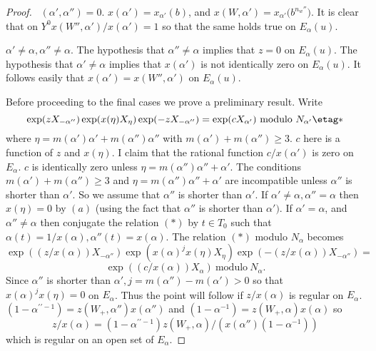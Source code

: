 \documentclass{memo-l}
\theoremstyle{definition}
\theoremstyle{remark}
\numberwithin{section}{chapter}
\numberwithin{equation}{chapter}
\begin{document}
\begin{proof}
\  $({\alpha}',{\alpha}'') = 0$.  $x({\alpha}')  = 
x_{{\alpha}'}(b)$, and $x(W,{\alpha}')  =  x_{{\alpha}'}{(b^{n_w''}})$.
It is clear that on $Y^{0}$\quad $x(W'',{\alpha}')/x({\alpha}')  =  1$ so that the
same holds true on $E_{{\alpha}}(u)$.
\enddefinition

 ${\alpha}' \ne {\alpha}, {\alpha}'' \ne {\alpha}$.  The
hypothesis that ${\alpha}'' \ne {\alpha}$ implies that $z = 0$ on
$E_{{\alpha}}(u)$.  The hypothesis that ${\alpha}' \ne {\alpha}$ implies
that $x({\alpha}')$ is not identically zero on $E_{{\alpha}}(u)$.  It
follows easily that $x({\alpha}')  =  x(W'',{\alpha}')$ on $E_{{\alpha}}(u)$.
\enddefinition


   Before proceeding to the final cases we prove a preliminary result.
Write
$$
\exp(zX_{-{\alpha}''})\exp(x({\eta})X_{{\eta}})\exp(-zX_{-{\alpha}''})  = 
\exp(cX_{{\alpha}'})\ {\text{modulo}}\ N_{{\alpha'}}  \etag *
$$
where ${\eta} = m({\alpha}'){\alpha}'+m({\alpha}''){\alpha''}$ with
$m({\alpha}')+m({\alpha}'') \ge 3$.  $c$ here is a function of $z$ and
$x({\eta})$.  I claim that the rational function $c/x({\alpha}')$ is zero
on $E_{{\alpha}}$.  $c$ is identically zero unless
$\eta = m(\alpha'')\alpha''+\alpha'$.  
The conditions
$m({\alpha}')+m({\alpha}'') \ge 3$ and $\eta = m(\alpha'')\alpha''+\alpha'$
are incompatible unless ${\alpha}''$
is shorter than ${\alpha}'$.  So we assume that ${\alpha}''$ is shorter than
${\alpha}'$.  If ${\alpha}'\ne {\alpha}, {\alpha}'' = {\alpha}$ then
$x({\eta}) = 0$ by $(a)$ (using the fact that ${\alpha}''$ is shorter than
${\alpha}')$.  If ${\alpha}' = {\alpha}$, and ${\alpha''} \ne {\alpha}$ then
conjugate the relation $(*)$ by $t  \in  T_{0}$ such that
${\alpha}(t) = 1/x({\alpha}), {\alpha}''(t) = x({\alpha})$.  The relation $(*)$
modulo $N_{{\alpha}}$ becomes
$$
\exp((z/x({\alpha}))X_{-{\alpha}''})\exp(x({\alpha})^{j}x({\eta})X_{{\eta}})
\exp(-(z/x({\alpha}))X_{-{\alpha}''})
 = 
$$
$$
\exp((c/x({\alpha}))X_{{\alpha}})\ {\text{modulo}}\  N_{{\alpha}}.
$$
Since ${\alpha}''$ is shorter than ${\alpha}', j = m({\alpha}'')-m({\alpha}')>0$
so that $x({\alpha})^{j}x({\eta}) = 0$ on $E_{{\alpha}}$.  Thus the point
will follow if $z/x({\alpha})$ is regular on $E_{{\alpha}}$.
$(1-{\alpha}^{\prime\prime-1}) = z(W_{+},{\alpha}'')x({\alpha}'')$ and $(1-{\alpha}^{-1})  = 
z(W_{+},{\alpha})x({\alpha})$ so $$z/x({\alpha})  = 
(1-{\alpha}^{\prime\prime-1})z(W_{+},{\alpha})/(x({\alpha}'')(1-{\alpha}^{-1}))$$ which is
regular on an open set of $E_{{\alpha}}$.


\end{proof}
\end{document}
